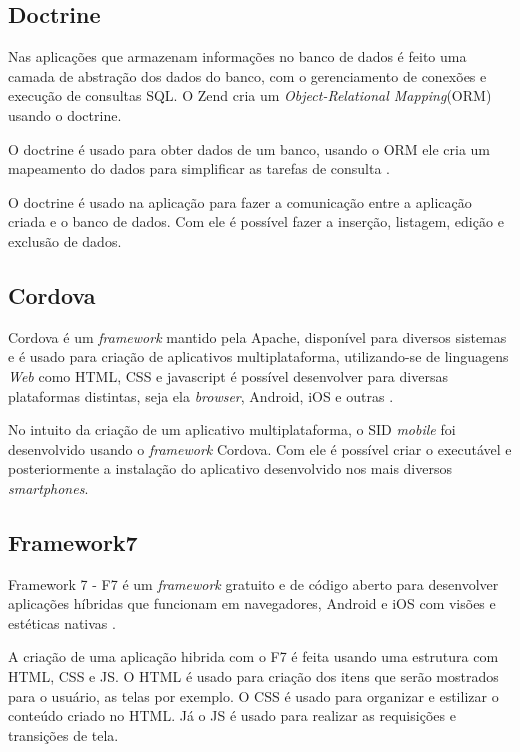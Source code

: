 \subsection{Doctrine}
Nas aplicações que armazenam informações no banco de dados é feito uma camada de abstração dos dados do banco, com o gerenciamento de conexões e execução de consultas SQL. O Zend cria um \textit{Object-Relational Mapping}(ORM) usando o doctrine.

O doctrine é usado para obter dados de um banco, usando o ORM ele cria um mapeamento do dados para simplificar as tarefas de consulta \cite[p.102]{vaswani2010}.

O doctrine é usado na aplicação para fazer a comunicação entre a aplicação criada e o banco de dados. Com ele é possível fazer a inserção, listagem, edição e exclusão de dados.

\subsection{Cordova}
Cordova é um \textit{framework} mantido pela Apache, disponível para diversos sistemas e é usado para criação de aplicativos multiplataforma, utilizando-se de linguagens \textit{Web} como HTML, CSS e javascript é possível desenvolver para diversas plataformas distintas, seja ela \textit{browser}, Android, iOS e outras \cite{prezotto2017}.

No intuito da criação de um aplicativo multiplataforma, o SID \textit{mobile} foi desenvolvido usando o \textit{framework} Cordova. Com ele é possível criar o executável e posteriormente a instalação do aplicativo desenvolvido nos mais diversos \textit{smartphones}.

\subsection{Framework7}
Framework 7 - F7 é um \textit{framework} gratuito e de código aberto para desenvolver aplicações híbridas que funcionam em navegadores, Android e iOS com visões e estéticas nativas \cite{f72018}.

A criação de uma aplicação hibrida com o F7 é feita usando uma estrutura com HTML, CSS e JS. O HTML é usado para criação dos itens que serão mostrados para o usuário, as telas por exemplo. O CSS é usado para organizar e estilizar o conteúdo criado no HTML. Já o JS é usado para realizar as requisições e transições de tela.